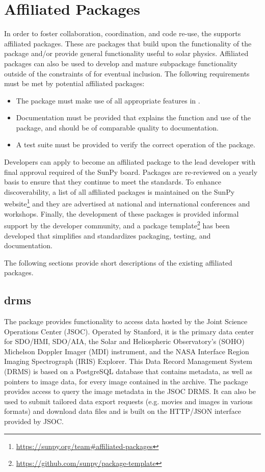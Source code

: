 \section{Affiliated Packages}
\label{sec:affil_package}

In order to foster collaboration, coordination, and code re-use, the \sunpyproj supports affiliated packages.
These are \python packages that build upon the functionality of the \sunpypkg package and/or provide general functionality useful to solar physics.
Affiliated packages can also be used to develop and mature subpackage functionality outside of the constraints of \sunpypkg for eventual inclusion.
The following requirements must be met by potential affiliated packages:
\begin{itemize}
    \item The package must make use of all appropriate features in \sunpypkg.
    \item Documentation must be provided that explains the function and use of the package, and should be of comparable quality to \sunpypkg documentation.
    \item A test suite must be provided to verify the correct operation of the package.
\end{itemize}
Developers can apply to become an affiliated package to the lead developer with final approval required of the SunPy board.
Packages are re-reviewed on a yearly basis to ensure that they continue to meet the standards.
To enhance discoverability, a list of all affiliated packages is maintained on the SunPy website\footnote{\url{https://sunpy.org/team\#affiliated-packages}} and they are advertised at national and international conferences and workshops.
Finally, the development of these packages is provided informal support by the developer community, and
a package template\footnote{\url{https://github.com/sunpy/package-template}} has been developed that simplifies and standardizes packaging, testing, and documentation.

The following sections provide short descriptions of the existing affiliated packages.

\subsection{drms}
\label{sec:drms}

The  package provides functionality to access data hosted by the Joint Science Operations Center (JSOC).
Operated by Stanford, it is the primary data center for SDO/HMI, SDO/AIA, the Solar and Heliospheric Observatory's (SOHO) Michelson Doppler Imager (MDI) instrument, and the NASA Interface Region Imaging Spectrograph (IRIS) Explorer.
This Data Record Management System (DRMS) is based on a PostgreSQL database that contains metadata, as well as pointers to image data, for every image contained in the archive.
The  package provides access to query the image metadata in the JSOC DRMS. It can also be used to submit tailored data export requests (e.g. movies and images in various formats) and download data files and is built on the HTTP/JSON interface provided by JSOC.

